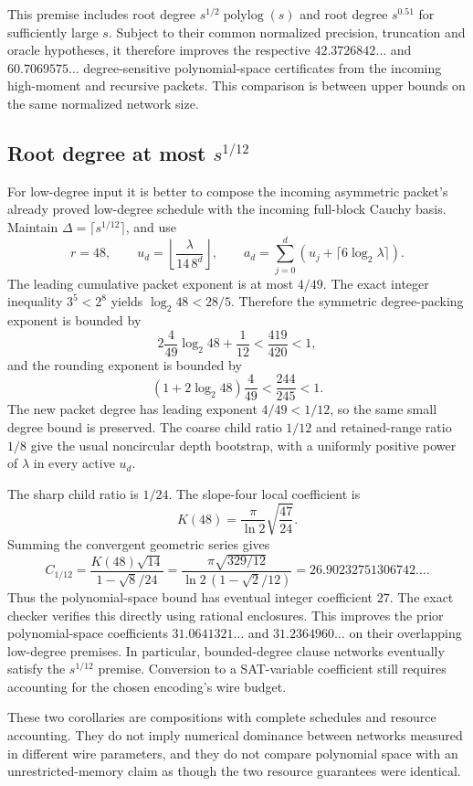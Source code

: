 This premise includes root degree $s^{1/2}\operatorname{polylog}(s)$ and
root degree $s^{0.51}$ for sufficiently large $s$.  Subject to their
common normalized precision, truncation and oracle hypotheses, it
therefore improves the respective $42.3726842\ldots$ and
$60.7069575\ldots$ degree-sensitive polynomial-space certificates from
the incoming high-moment and recursive packets.  This comparison is
between upper bounds on the same normalized network size.

\subsection{Root degree at most \texorpdfstring{$s^{1/12}$}{s to the power 1/12}}

For low-degree input it is better to compose the incoming asymmetric
packet's already proved low-degree schedule with the incoming full-block
Cauchy basis.  Maintain $\Delta=\lceil s^{1/12}\rceil$, and use
\[
 r=48,\qquad
 u_d=\left\lfloor\frac{\lambda}{14\,8^d}\right\rfloor,\qquad
 a_d=\sum_{j=0}^d\left(u_j+\lceil6\log_2\lambda\rceil\right).
\]
The leading cumulative packet exponent is at most $4/49$.  The exact
integer inequality $3^5<2^8$ yields $\log_2 48<28/5$.  Therefore the
symmetric degree-packing exponent is bounded by
\[
 2\frac4{49}\log_2 48+\frac1{12}
 <\frac{419}{420}<1,
\]
and the rounding exponent is bounded by
\[
 \left(1+2\log_2 48\right)\frac4{49}
 <\frac{244}{245}<1.
\]
The new packet degree has leading exponent $4/49<1/12$, so the same
small degree bound is preserved.  The coarse child ratio $1/12$ and
retained-range ratio $1/8$ give the usual noncircular depth bootstrap,
with a uniformly positive power of $\lambda$ in every active $u_d$.

The sharp child ratio is $1/24$.  The slope-four local coefficient is
\[
 K(48)=\frac{\pi}{\ln2}\sqrt{\frac{47}{24}}.
\]
Summing the convergent geometric series gives
\[
 C_{1/12}
 =\frac{K(48)\sqrt{14}}{1-\sqrt8/24}
 =\frac{\pi\sqrt{329/12}}
        {\ln2\,(1-\sqrt2/12)}
 =26.90232751306742\ldots.
\]
Thus the polynomial-space bound has eventual integer coefficient $27$.
The exact checker verifies this directly using rational enclosures.
This improves the prior polynomial-space coefficients
$31.0641321\ldots$ and $31.2364960\ldots$ on their overlapping low-degree
premises.  In particular, bounded-degree clause networks eventually
satisfy the $s^{1/12}$ premise.  Conversion to a SAT-variable coefficient
still requires accounting for the chosen encoding's wire budget.

These two corollaries are compositions with complete schedules and
resource accounting.  They do not imply numerical dominance between
networks measured in different wire parameters, and they do not compare
polynomial space with an unrestricted-memory claim as though the two
resource guarantees were identical.
